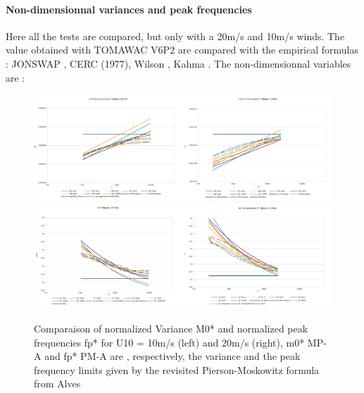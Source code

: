 \paragraph{Non-dimensionnal variances and peak frequencies}
Here all the tests are compared, but only with a 20m/s and 10m/s winds. The value obtained with TOMAWAC V6P2 are compared with the empirical formulas : JONSWAP \cite{haselmann1}, CERC (1977), Wilson \cite{wilson65}, Kahma \cite{kahma}. The non-dimensionnal variables are :\\
\begin{figure}[H]
  \centering
  	\includegraphics[width=0.5\textwidth]{M0v10id.pdf}\includegraphics[width=0.5\textwidth]{M0v20id.pdf}\\
  	\includegraphics[width=0.5\textwidth]{fpv10id.pdf}\includegraphics[width=0.5\textwidth]{fpv20id.pdf}\\
      \caption{Comparaison of normalized Variance M0* and normalized peak frequencies fp* for U10 = 10m/s (left) and 20m/s (right), m0* MP-A and fp* PM-A are , respectively, the variance and the peak frequency limits given by the revisited Pierson-Moskowitz formula from Alves \cite{alves}}
\label{variancefet}
\end{figure}
